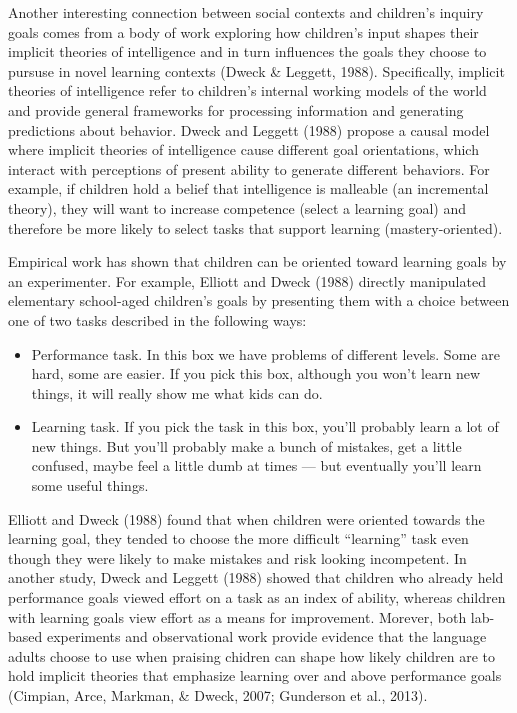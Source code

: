 \documentclass[english,floatsintext,man]{apa6}
\providecommand{\tightlist}{%
  \setlength{\itemsep}{0pt}\setlength{\parskip}{0pt}}
\theoremstyle{definition}
\theoremstyle{definition}
\theoremstyle{definition}
\theoremstyle{remark}
\begin{document}
Another interesting connection between social contexts and children's
inquiry goals comes from a body of work exploring how children's input
shapes their implicit theories of intelligence and in turn influences
the goals they choose to pursuse in novel learning contexts (Dweck \&
Leggett, 1988). Specifically, implicit theories of intelligence refer to
children's internal working models of the world and provide general
frameworks for processing information and generating predictions about
behavior. Dweck and Leggett (1988) propose a causal model where implicit
theories of intelligence cause different goal orientations, which
interact with perceptions of present ability to generate different
behaviors. For example, if children hold a belief that intelligence is
malleable (an incremental theory), they will want to increase competence
(select a learning goal) and therefore be more likely to select tasks
that support learning (mastery-oriented).

Empirical work has shown that children can be oriented toward learning
goals by an experimenter. For example, Elliott and Dweck (1988) directly
manipulated elementary school-aged children's goals by presenting them
with a choice between one of two tasks described in the following ways:

\begin{itemize}
\tightlist
\item
  Performance task. In this box we have problems of different levels.
  Some are hard, some are easier. If you pick this box, although you
  won't learn new things, it will really show me what kids can do.
\item
  Learning task. If you pick the task in this box, you'll probably learn
  a lot of new things. But you'll probably make a bunch of mistakes, get
  a little confused, maybe feel a little dumb at times --- but
  eventually you'll learn some useful things.
\end{itemize}

\noindent
Elliott and Dweck (1988) found that when children were oriented towards
the learning goal, they tended to choose the more difficult
\enquote{learning} task even though they were likely to make mistakes
and risk looking incompetent. In another study, Dweck and Leggett (1988)
showed that children who already held performance goals viewed effort on
a task as an index of ability, whereas children with learning goals view
effort as a means for improvement. Morever, both lab-based experiments
and observational work provide evidence that the language adults choose
to use when praising chidren can shape how likely children are to hold
implicit theories that emphasize learning over and above performance
goals (Cimpian, Arce, Markman, \& Dweck, 2007; Gunderson et al., 2013).
\end{document}
